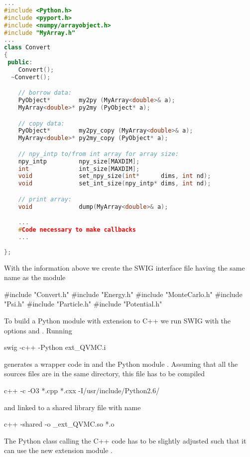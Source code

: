 \begin{lstlisting}[language=c++]
...
#include <Python.h>
#include <pyport.h>
#include <numpy/arrayobject.h>
#include "MyArray.h"
...
class Convert
{
 public:
    Convert();
  ~Convert();

    // borrow data:
    PyObject*        my2py (MyArray<double>& a);
    MyArray<double>* py2my (PyObject* a);

    // copy data:
    PyObject*        my2py_copy (MyArray<double>& a);
    MyArray<double>* py2my_copy (PyObject* a);

    // npy_intp to/from int array for array size:
    npy_intp         npy_size[MAXDIM];
    int              int_size[MAXDIM];
    void             set_npy_size(int*      dims, int nd);
    void             set_int_size(npy_intp* dims, int nd);

    // print array:
    void             dump(MyArray<double>& a);

    ...
    #Code necessary to make callbacks
    ...
 
};
\end{lstlisting}
\noindent
With the information above we create the SWIG interface file  having the same name as the module \cite{Beazley}
\begin{src}
#include "Convert.h"
#include "Energy.h"
#include "MonteCarlo.h"
#include "Psi.h"
#include "Particle.h"
#include "Potential.h"
\end{src}
\noindent
To build a Python module with extension to C++ we run SWIG with the options  and . Running
\begin{src}
swig -c++ -Python ext_QVMC.i
\end{src}
generates a wrapper code in  and the Python module . Assuming that all the sources files are in the same directory, this file has to be compiled
\begin{src}
c++ -c -O3 *.cpp *.cxx -I/usr/include/Python2.6/
\end{src}
and linked to a shared library file with name 
\begin{src}
c++ -shared -o _ext_QVMC.so *.o
\end{src}
The Python  class calling the C++ code has to be slightly adjusted such that it can use the new extension module .

